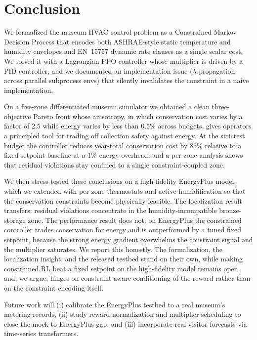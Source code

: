 \documentclass[11pt,a4paper]{article}
\begin{document}
\section{Conclusion}\label{sec:conclusion}

We formalized the museum HVAC control problem as a Constrained
Markov Decision Process that encodes both ASHRAE-style static
temperature and humidity envelopes and EN~15757 dynamic rate clauses
as a single scalar cost. We solved it with a Lagrangian-PPO
controller whose multiplier is driven by a PID controller, and we
documented an implementation issue ($\lambda$ propagation across
parallel subprocess envs) that silently invalidates the constraint
in a naive implementation.

On a five-zone differentiated museum simulator we obtained a clean
three-objective Pareto front whose anisotropy, in which conservation
cost varies by a factor of $2.5$ while energy varies by less than
$0.5\%$ across budgets, gives operators a principled tool for trading
off collection safety against energy. At the strictest budget the
controller reduces year-total conservation cost by $85\%$ relative to a
fixed-setpoint baseline at a $1\%$ energy overhead, and a per-zone
analysis shows that residual violations stay confined to a single
constraint-coupled zone.

We then stress-tested these conclusions on a high-fidelity EnergyPlus
model, which we extended with per-zone thermostats and active
humidification so that the conservation constraints become physically
feasible. The localization result transfers: residual violations
concentrate in the humidity-incompatible bronze-storage zone. The
performance result does not: on EnergyPlus the constrained controller
trades conservation for energy and is outperformed by a tuned fixed
setpoint, because the strong energy gradient overwhelms the constraint
signal and the multiplier saturates. We report this honestly. The
formalization, the localization insight, and the released testbed stand
on their own, while making constrained RL beat a fixed setpoint on the
high-fidelity model remains open and, we argue, hinges on
constraint-aware conditioning of the reward rather than on the
constraint encoding itself.

Future work will (i) calibrate the EnergyPlus testbed to a real
museum's metering records, (ii) study reward normalization and
multiplier scheduling to close the mock-to-EnergyPlus gap, and (iii)
incorporate real visitor forecasts via time-series transformers.
\end{document}
